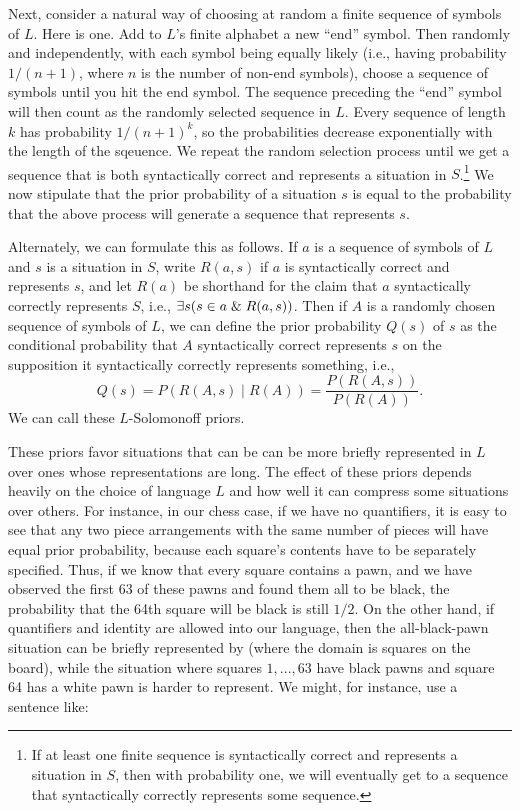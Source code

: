 Next, consider a natural way of choosing at random a finite sequence of symbols of $L$. Here is one. Add to $L$'s finite alphabet 
a new ``end'' symbol. Then randomly and independently, with each symbol being equally likely (i.e., having probability
$1/(n+1)$, where $n$ is the number of non-end symbols), choose a sequence of
symbols until you hit the end symbol. The sequence preceding the ``end'' symbol will then count as the randomly
selected sequence in $L$. Every sequence of length $k$ has probability $1/(n+1)^k$, so the probabilities decrease 
exponentially with the length of the sqeuence. We repeat the random selection process until we get a sequence that is both syntactically correct
and represents a situation in $S$.\footnote{If at least one finite sequence is syntactically correct and represents a 
situation in $S$, then with probability one, we will eventually get to a sequence that syntactically correctly represents some 
sequence.}  We now stipulate that the prior probability of a situation $s$ is equal to the probability that the
above process will generate a sequence that represents $s$.

Alternately, we can formulate this as follows. If $a$ is a sequence of symbols of $L$ and $s$ is a situation in $S$, write
$R(a,s)$ if $a$ is syntactically correct and represents $s$, and let $R(a)$ be shorthand for the claim that $a$ syntactically
correctly represents $S$, i.e., $\exists s(s\in a\mathrel{\&} R(a,s))$. Then if $A$ is a randomly chosen sequence of symbols of $L$,
we can define the prior probability $Q(s)$ of $s$ as the conditional probability that $A$ syntactically correct represents $s$ on the supposition
it syntactically correctly represents something, i.e.,
$$
    Q(s) = P(R(A,s)\mid R(A)) = \frac{P(R(A,s))}{P(R(A))}.
$$    
We can call these $L$-Solomonoff priors.

These priors favor situations that can be can be more briefly represented in $L$ over ones whose representations are long.
The effect of these priors depends heavily on the choice of language $L$ and how well it can compress some situations over
others. For instance, in our chess case, if we have no quantifiers, it is easy to see that any two piece arrangements with 
the same number of pieces will have equal prior probability, because each square's contents have to be separately specified. 
Thus, if we know that every square contains a pawn, and we have observed the first 63 of these pawns and found them all to be black, the 
probability that the 64th square will be black is still $1/2$. On the other hand, if quantifiers and identity are allowed into our
language, then the all-black-pawn situation can be briefly represented by
(where the domain is
squares on the board), while the situation where squares $1,...,63$ have black pawns and square 64 has a white pawn is harder
to represent. We might, for instance, use a sentence like:

